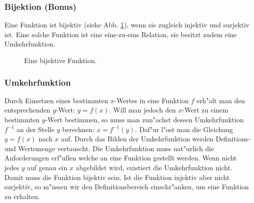 \subsubsection{Bijektion (Bonus)}
Eine Funktion ist bijektiv (siehe Abb. \ref{fig:bijectiv}), wenn sie zugleich injektiv und surjektiv ist. Eine solche Funktion ist eine eins-zu-eins Relation, sie besitzt zudem eine Umkehrfunktion.
\begin{figure}[h!]
 \centering
 \caption{Eine bijektive Funktion.}
 \label{fig:bijectiv}
\end{figure}

\subsubsection{Umkehrfunktion}
Durch Einsetzen eines bestimmten $x$-Wertes in eine Funktion $f$ erh"alt man den entsprechenden $y$-Wert: $y=f(x)$. Will man jedoch den $x$-Wert zu einem bestimmten $y$-Wert bestimmen, so muss man zun"achst dessen Umkehrfunktion $f^{-1}$ an der Stelle $y$ berechnen: $x=f^{-1}(y)$. Daf"ur l"ost man die Gleichung $y=f(x)$ nach $x$ auf. Durch das Bilden der Umkehrfunktion werden Definitions- und Wertemenge vertauscht. Die Umkehrfunktion muss nat"urlich die Anforderungen erf"ullen welche an eine Funktion gestellt werden. Wenn nicht jedes $y$ auf genau ein $x$ abgebildet wird, existiert die Umkehrfunktion nicht. Damit muss die Funktion bijektiv sein. Ist die Funktion injektiv aber nicht surjektiv, so m"ussen wir den Definitionsbereich einschr"anken, um eine Funktion zu erhalten. 

